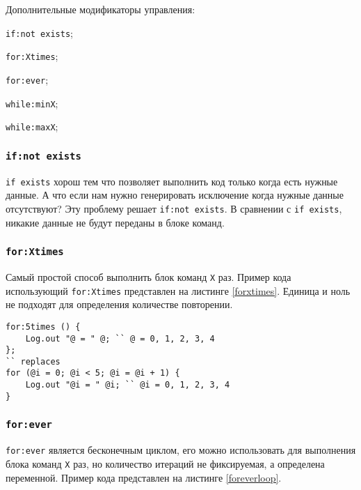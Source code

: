 Дополнительные модификаторы управления:
\begin{icItems}
	\item \texttt{if:not exists};
	\item \texttt{for:Xtimes};
	\item \texttt{for:ever};
	\item \texttt{while:minX};
	\item \texttt{while:maxX};
\end{icItems}

\subsubsection{\texttt{if:not exists}}

\texttt{if exists} хорош тем что позволяет выполнить код только когда есть нужные данные. А что если нам нужно генерировать исключение когда нужные данные отсутствуют? Эту проблему решает \texttt{if:not exists}. В сравнении с \texttt{if exists}, никакие данные не будут переданы в блоке команд.

\subsubsection{\texttt{for:Xtimes}}

Самый простой способ выполнить блок команд \texttt{X} раз. Пример кода использующий \texttt{for:Xtimes} представлен на листинге \ref{forxtimes}. Единица и ноль не подходят для определения количестве повторении.

\begin{sourcecode}
\label{forxtimes}
\begin{verbatim}
for:5times () {
	Log.out "@ = " @; `` @ = 0, 1, 2, 3, 4
};
`` replaces
for (@i = 0; @i < 5; @i = @i + 1) {
	Log.out "@i = " @i; `` @i = 0, 1, 2, 3, 4
}
\end{verbatim}
\end{sourcecode}

\subsubsection{\texttt{for:ever}}

\texttt{for:ever} является бесконечным циклом, его можно использовать для выполнения блока команд \texttt{X} раз, но количество итераций не фиксируемая, а определена переменной. Пример кода представлен на листинге \ref{foreverloop}.

